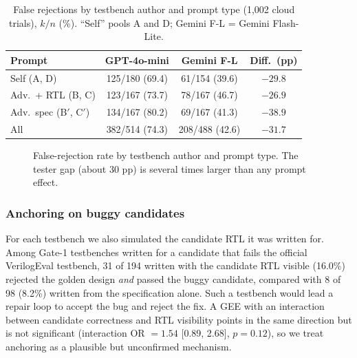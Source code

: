 \documentclass[conference]{IEEEtran}
\begin{document}
\begin{table}[t]
\centering
\caption{False rejections by testbench author and prompt type (1,002 cloud trials), $k/n$ (\%). ``Self'' pools A and D; Gemini F-L = Gemini Flash-Lite.}
\label{tab:tester}
\footnotesize
\setlength{\tabcolsep}{4pt}
\begin{tabular}{lccc}
\toprule
\textbf{Prompt} & \textbf{GPT-4o-mini} & \textbf{Gemini F-L} & \textbf{Diff.\ (pp)} \\
\midrule
Self (A, D)            & 125/180 (69.4) & 61/154 (39.6) & $-29.8$ \\
Adv.\ + RTL (B, C)     & 123/167 (73.7) & 78/167 (46.7) & $-26.9$ \\
Adv.\ spec (B$'$, C$'$) & 134/167 (80.2) & 69/167 (41.3) & $-38.9$ \\
\midrule
All                    & 382/514 (74.3) & 208/488 (42.6) & $-31.7$ \\
\bottomrule
\end{tabular}
\end{table}

\begin{figure}[t]
\centering
{}
\caption{False-rejection rate by testbench author and prompt type. The tester gap (about 30 pp) is several times larger than any prompt effect.}
\label{fig:tester}
\end{figure}

\subsubsection{Anchoring on buggy candidates}
For each testbench we also simulated the candidate RTL it was written for. Among Gate-1 testbenches written for a candidate that fails the official VerilogEval testbench, 31 of 194 written with the candidate RTL visible (16.0\%) rejected the golden design \textit{and} passed the buggy candidate, compared with 8 of 98 (8.2\%) written from the specification alone. Such a testbench would lead a repair loop to accept the bug and reject the fix. A GEE with an interaction between candidate correctness and RTL visibility points in the same direction but is not significant (interaction OR $= 1.54$ [0.89, 2.68], $p = 0.12$), so we treat anchoring as a plausible but unconfirmed mechanism.
\end{document}
